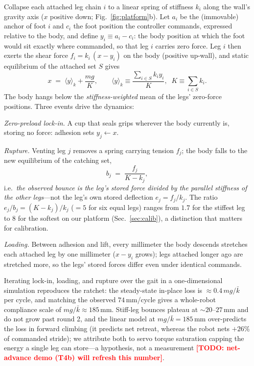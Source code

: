\documentclass[journal]{IEEEtran}
\newcommand{\TODO}[1]{\textcolor{red}{\textbf{[TODO: #1]}}}
\begin{document}
Collapse each attached leg chain $i$ to a linear spring of stiffness
$k_i$ along the wall's gravity axis ($x$ positive down;
Fig.~\ref{fig:platform}b). Let $a_i$ be the (immovable) anchor of foot
$i$ and $c_i$ the foot position the controller commands, expressed
relative to the body, and define $y_i \equiv a_i - c_i$: the body
position at which the foot would sit exactly where commanded, so that
leg $i$ carries zero force. Leg $i$ then exerts the shear
force $f_i = k_i\,(x - y_i)$ on the body (positive up-wall), and static
equilibrium of the attached set $S$ gives
\begin{equation}
x \;=\; \langle y\rangle_k + \frac{mg}{K},
\qquad
\langle y\rangle_k \equiv \frac{\sum_{i\in S} k_i y_i}{K},\;\;
K \equiv \sum_{i\in S} k_i .
\label{eq:equilibrium}
\end{equation}
The body hangs below the \emph{stiffness-weighted} mean of the legs'
zero-force positions. Three events drive the dynamics:

\emph{Zero-preload lock-in.} A cup that seals grips wherever the body
currently is, storing no force: adhesion sets $y_j \leftarrow x$.

\emph{Rupture.} Venting leg $j$ removes a spring carrying tension
$f_j$; the body falls to the new equilibrium of the catching set,
\begin{equation}
b_j \;=\; \frac{f_j}{K - k_j},
\label{eq:bounce}
\end{equation}
i.e.\ \emph{the observed bounce is the leg's stored force divided by the
parallel stiffness of the other legs}---not the leg's own stored
deflection $e_j = f_j/k_j$. The ratio $e_j/b_j = (K-k_j)/k_j$ ($=5$
for six equal legs) ranges from $1.7$ for the stiffest leg to $8$ for
the softest on our platform (Sec.~\ref{sec:calib}), a distinction that
matters for calibration.

\emph{Loading.} Between adhesion and lift, every millimeter the body
descends stretches each attached leg by one millimeter ($x-y_i$ grows);
legs attached longer ago are stretched more, so the legs' stored forces
differ even under identical commands.

Iterating lock-in, loading, and rupture over the gait in a
one-dimensional simulation reproduces the ratchet: the steady-state
in-place loss is
${\approx}0.4\,mg/\bar{k}$ per cycle, and matching the observed
$74$\,mm/cycle gives a whole-robot compliance scale of
$mg/\bar{k}\approx185$\,mm. Stiff-leg bounces plateau at
${\sim}20$--$27$\,mm and do not grow past round 2, and the linear model
at $mg/\bar{k}=185$\,mm over-predicts the loss in forward climbing (it
predicts net retreat, whereas the robot nets $+26\%$ of commanded
stride); we attribute both to servo torque saturation capping the
energy a single leg can store---a hypothesis, not a measurement
\TODO{net-advance demo (T4b) will refresh this number}.
\end{document}
